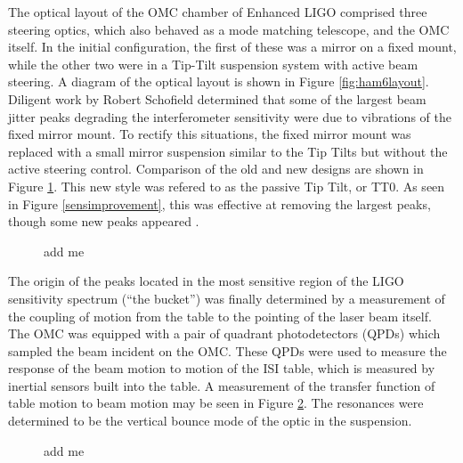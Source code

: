 The optical layout of the OMC chamber of Enhanced LIGO comprised three steering optics, which also behaved as a mode matching telescope, and the OMC itself. %
In the initial configuration, the first of these was a mirror on a fixed mount, while the other two were in a Tip-Tilt suspension system with active beam steering. %
A diagram of the optical layout is shown in Figure \ref{fig:ham6layout}. %
Diligent work by Robert Schofield determined that some of the largest beam jitter peaks degrading the interferometer sensitivity were due to vibrations of the fixed mirror mount. To rectify this situations, the fixed mirror mount was replaced with a small mirror suspension similar to the Tip Tilts but without the active steering control. %
Comparison of the old and new designs are shown in Figure \ref{fig:TT0photos}. %
This new style was refered to as the passive Tip Tilt, or TT0. %
As seen in Figure \ref{sensimprovement}, this was effective at removing the largest peaks, though some new peaks appeared .

\begin{figure}
  \begin{center}
  \leavevmode
  \end{center}
  \caption[add me]{add me}
  \label{fig:TT0photos}
\end{figure}

The origin of the peaks located in the most sensitive region of the LIGO sensitivity spectrum (``the bucket'') was finally determined by a measurement of the coupling of motion from the table to the pointing of the laser beam itself. %
The OMC was equipped with a pair of quadrant photodetectors (QPDs) which sampled the beam incident on the OMC. %
These QPDs were used to measure the response of the beam motion to motion of the ISI table, which is measured by inertial sensors built into the table. %
A measurement of the transfer function of table motion to beam motion may be seen in Figure \ref{fig:TTbounceTF}. %
The resonances were determined to be the vertical bounce mode of the optic in the suspension. %

\begin{figure}
  \begin{center}
  \leavevmode
  \end{center}
  \caption[add me]{add me}
  \label{fig:TTbounceTF}
\end{figure}

